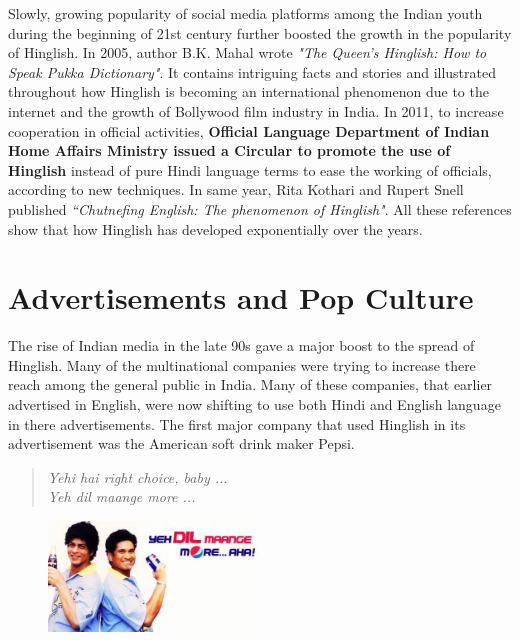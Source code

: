 \documentclass{article}
\begin{document}
Slowly, growing popularity of social media platforms among the Indian youth during the beginning of 21st century further boosted the growth in the popularity of Hinglish. In 2005, author B.K. Mahal wrote \textit{"The Queen's Hinglish: How to Speak Pukka Dictionary"}. It contains intriguing facts and stories and illustrated throughout how Hinglish is becoming an international phenomenon due to the internet and the growth of Bollywood film industry in India. In 2011, to increase cooperation in official activities, \textbf{Official Language Department of Indian Home Affairs Ministry issued a Circular to promote the use of Hinglish} instead of pure Hindi language terms to ease the working of officials, according to new techniques. In same year, Rita Kothari and Rupert Snell published \textit{``Chutnefing English: The phenomenon of Hinglish"}. All these references show that how Hinglish has developed exponentially over the years.

\section{Advertisements and Pop Culture}
The rise of Indian media in the late 90s gave a major boost to the spread of Hinglish. Many of the multinational companies were trying to increase there reach among the general public in India. Many of these companies, that earlier advertised in English, were now shifting to use both Hindi and English language in there advertisements. The first major company that used Hinglish in its advertisement was the American soft drink maker Pepsi.
\begin{quote}
    \centering
    \textit{Yehi hai right choice, baby ...}\\
    \textit{Yeh dil maange more ...}
\end{quote}

\begin{figure}[H]
    \centering
    \includegraphics[width=0.5\textwidth]{images/pepsi.jpg}
\end{figure}
\end{document}
